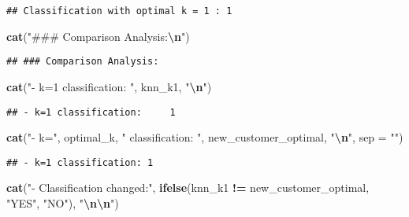 \documentclass[
]{article}
\newenvironment{Shaded}{\begin{snugshade}}{\end{snugshade}}
\newcommand{\AttributeTok}[1]{\textcolor[rgb]{0.13,0.29,0.53}{#1}}
\newcommand{\FunctionTok}[1]{\textcolor[rgb]{0.13,0.29,0.53}{\textbf{#1}}}
\newcommand{\NormalTok}[1]{#1}
\newcommand{\SpecialCharTok}[1]{\textcolor[rgb]{0.81,0.36,0.00}{\textbf{#1}}}
\newcommand{\StringTok}[1]{\textcolor[rgb]{0.31,0.60,0.02}{#1}}
\begin{document}
\begin{verbatim}
## Classification with optimal k = 1 : 1
\end{verbatim}

\begin{Shaded}
\begin{Highlighting}[]
\FunctionTok{cat}\NormalTok{(}\StringTok{"\#\#\# Comparison Analysis:}\SpecialCharTok{\textbackslash{}n}\StringTok{"}\NormalTok{)}
\end{Highlighting}
\end{Shaded}

\begin{verbatim}
## ### Comparison Analysis:
\end{verbatim}

\begin{Shaded}
\begin{Highlighting}[]
\FunctionTok{cat}\NormalTok{(}\StringTok{"{-} k=1 classification:    "}\NormalTok{, knn\_k1, }\StringTok{"}\SpecialCharTok{\textbackslash{}n}\StringTok{"}\NormalTok{)}
\end{Highlighting}
\end{Shaded}

\begin{verbatim}
## - k=1 classification:     1
\end{verbatim}

\begin{Shaded}
\begin{Highlighting}[]
\FunctionTok{cat}\NormalTok{(}\StringTok{"{-} k="}\NormalTok{, optimal\_k, }\StringTok{" classification: "}\NormalTok{, new\_customer\_optimal, }\StringTok{"}\SpecialCharTok{\textbackslash{}n}\StringTok{"}\NormalTok{, }\AttributeTok{sep =} \StringTok{""}\NormalTok{)}
\end{Highlighting}
\end{Shaded}

\begin{verbatim}
## - k=1 classification: 1
\end{verbatim}

\begin{Shaded}
\begin{Highlighting}[]
\FunctionTok{cat}\NormalTok{(}\StringTok{"{-} Classification changed:"}\NormalTok{, }\FunctionTok{ifelse}\NormalTok{(knn\_k1 }\SpecialCharTok{!=}\NormalTok{ new\_customer\_optimal, }\StringTok{"YES"}\NormalTok{, }\StringTok{"NO"}\NormalTok{), }\StringTok{"}\SpecialCharTok{\textbackslash{}n\textbackslash{}n}\StringTok{"}\NormalTok{)}
\end{Highlighting}
\end{Shaded}
\end{document}
